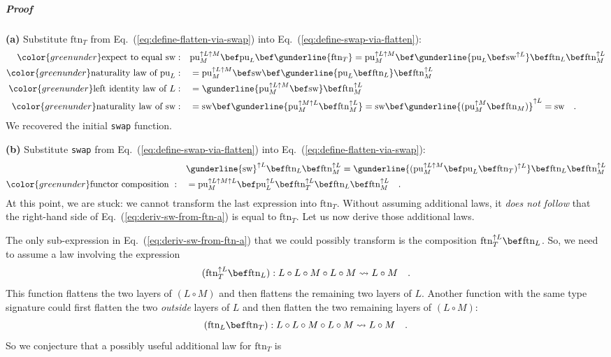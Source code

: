 \subparagraph{Proof}

\textbf{(a)} Substitute $\text{ftn}_{T}$ from Eq.~(\ref{eq:define-flatten-via-swap})
into Eq.~(\ref{eq:define-swap-via-flatten}):
\begin{align*}
{\color{greenunder}\text{expect to equal }\text{sw}:}\quad & \text{pu}_{M}^{\uparrow L\uparrow M}\bef\text{pu}_{L}\bef\gunderline{\text{ftn}_{T}}=\text{pu}_{M}^{\uparrow L\uparrow M}\bef\gunderline{\text{pu}_{L}\bef\text{sw}^{\uparrow L}}\bef\text{ftn}_{L}\bef\text{ftn}_{M}^{\uparrow L}\\
{\color{greenunder}\text{naturality law of }\text{pu}_{L}:}\quad & =\text{pu}_{M}^{\uparrow L\uparrow M}\bef\text{sw}\bef\gunderline{\text{pu}_{L}\bef\text{ftn}_{L}}\bef\text{ftn}_{M}^{\uparrow L}\\
{\color{greenunder}\text{left identity law of }L:}\quad & =\gunderline{\text{pu}_{M}^{\uparrow L\uparrow M}\bef\text{sw}}\bef\text{ftn}_{M}^{\uparrow L}\\
{\color{greenunder}\text{naturality law of }\text{sw}:}\quad & =\text{sw}\bef\gunderline{\text{pu}_{M}^{\uparrow M\uparrow L}\bef\text{ftn}_{M}^{\uparrow L}}=\text{sw}\bef\gunderline{(\text{pu}_{M}^{\uparrow M}\bef\text{ftn}_{M})}^{\uparrow L}=\text{sw}\quad.
\end{align*}
We recovered the initial \lstinline!swap! function.

\textbf{(b)} Substitute \lstinline!swap! from Eq.~(\ref{eq:define-swap-via-flatten})
into Eq.~(\ref{eq:define-flatten-via-swap}):
\begin{align}
 & \gunderline{\text{sw}}^{\uparrow L}\bef\text{ftn}_{L}\bef\text{ftn}_{M}^{\uparrow L}=\gunderline{(\text{pu}_{M}^{\uparrow L\uparrow M}\bef\text{pu}_{L}\bef\text{ftn}_{T})^{\uparrow L}}\bef\text{ftn}_{L}\bef\text{ftn}_{M}^{\uparrow L}\nonumber \\
{\color{greenunder}\text{functor composition }:}\quad & =\text{pu}_{M}^{\uparrow L\uparrow M\uparrow L}\bef\text{pu}_{L}^{\uparrow L}\bef\text{ftn}_{T}^{\uparrow L}\bef\text{ftn}_{L}\bef\text{ftn}_{M}^{\uparrow L}\quad.\label{eq:deriv-sw-from-ftn-a}
\end{align}
At this point, we are stuck: we cannot transform the last expression
into $\text{ftn}_{T}$. Without assuming additional laws, it \emph{does
not follow} that the right-hand side of Eq.~(\ref{eq:deriv-sw-from-ftn-a})
is equal to $\text{ftn}_{T}$. Let us now derive those additional
laws. 

The only sub-expression in Eq.~(\ref{eq:deriv-sw-from-ftn-a}) that
we could possibly transform is the composition $\text{ftn}_{T}^{\uparrow L}\bef\text{ftn}_{L}$.
So, we need to assume a law involving the expression 
\[
(\text{ftn}_{T}^{\uparrow L}\bef\text{ftn}_{L}):L\circ L\circ M\circ L\circ M\leadsto L\circ M\quad.
\]
This function flattens the two layers of $\left(L\circ M\right)$
and then flattens the remaining two layers of $L$. Another function
with the same type signature could first flatten the two \emph{outside}
layers of $L$ and then flatten the two remaining layers of $\left(L\circ M\right)$:
\[
(\text{ftn}_{L}\bef\text{ftn}_{T}):L\circ L\circ M\circ L\circ M\leadsto L\circ M\quad.
\]
So we conjecture that a possibly useful additional law for $\text{ftn}_{T}$
is

